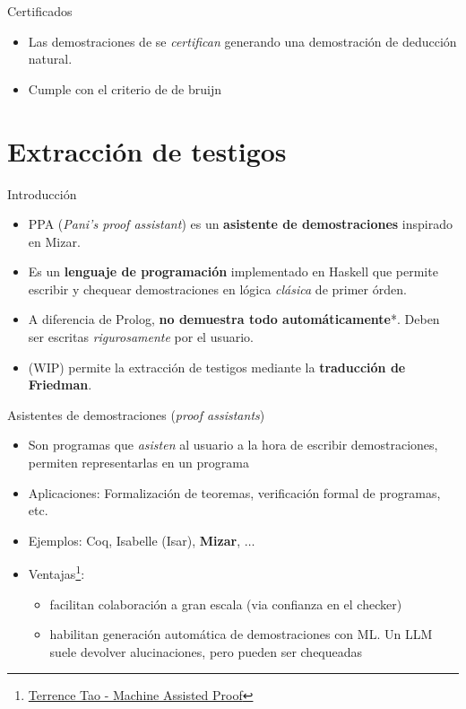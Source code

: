 \documentclass[xcolor={dvipsnames},spanish]{beamer}
\begin{document}
\begin{frame}{Certificados}
    \begin{itemize}
        \item Las demostraciones de \ppaLang se \textit{certifican} generando
        una demostración de deducción natural.
        \item Cumple con el criterio de de bruijn 
    \end{itemize}
    
\end{frame}

\section{Extracción de testigos}



\begin{frame}{Introducción}
    \begin{itemize}
        \item PPA (\textit{Pani's proof assistant}) es un \textbf{asistente de demostraciones} inspirado en Mizar.
        \item Es un \textbf{lenguaje de programación} implementado en Haskell que permite escribir y chequear demostraciones en lógica \textit{clásica} de primer órden.
        \item A diferencia de Prolog, \textbf{no demuestra todo automáticamente}*. Deben ser escritas \textit{rigurosamente} por el usuario.
        \item (WIP) permite la extracción de testigos mediante la \textbf{traducción de Friedman}.
    \end{itemize}
\end{frame}

\begin{frame}{Asistentes de demostraciones (\textit{proof assistants})}
    \begin{itemize}
        \item Son programas que \textit{asisten} al usuario a la hora de escribir demostraciones, permiten representarlas en un programa
        \item Aplicaciones: Formalización de teoremas, verificación formal de programas, etc.
        \item Ejemplos: Coq, Isabelle (Isar), \textbf{Mizar}, $\dots$
        \item Ventajas\footnote{\href{https://youtu.be/AayZuuDDKP0?si=eGETzgh9PQ_8JecR}{Terrence Tao - Machine Assisted Proof}}:
        \begin{itemize}
            \item facilitan colaboración a gran escala (via confianza en el checker)
            \item habilitan generación automática de demostraciones con ML. Un LLM suele devolver alucinaciones, pero pueden ser chequeadas
        \end{itemize}
        
    \end{itemize}
\end{frame}
\end{document}
